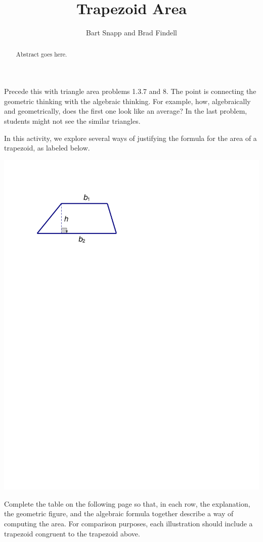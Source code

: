 \documentclass{ximera}
\author{Bart Snapp and Brad Findell}
\title{Trapezoid Area}
\begin{document}
\begin{abstract}
Abstract goes here.  
\end{abstract}
\maketitle


\begin{instructorIntro}
Precede this with triangle area problems 1.3.7 and 8.  The point is connecting the geometric thinking with the algebraic thinking.  For example, how, algebraically and geometrically, does the first one look like an average?  In the last problem, students might not see the similar triangles.
\end{instructorIntro}

\begin{problem}
In this activity, we explore several ways of justifying the formula for the area of a trapezoid, as labeled below. 
\begin{image}
\includegraphics[scale=0.6]{./graphics/trapezoid1.pdf}
\end{image}
Complete the table on the following page so that, in each row, the explanation, the geometric figure, and the algebraic formula together describe a way of computing the area.  For comparison purposes, each illustration should include a trapezoid congruent to the trapezoid above.   


\end{problem}
\end{document}
